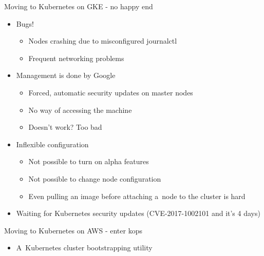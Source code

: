 \documentclass{beamer}
\begin{document}
  \begin{frame}{Moving to Kubernetes on GKE - no happy end}
  \begin{itemize}
    \item Bugs!
    \begin{itemize}
      \item Nodes crashing due to misconfigured journalctl
      \item Frequent networking problems
    \end{itemize}
    \item Management is done by Google
    \begin{itemize}
      \item Forced, automatic security updates on master nodes
      \item No way of accessing the machine
      \item Doesn't work? Too bad
    \end{itemize}
    \item Inflexible configuration
    \begin{itemize}
      \item Not possible to turn on alpha features
      \item Not possible to change node configuration
      \item Even pulling an image before attaching a~node to the cluster is hard
    \end{itemize}
  \item Waiting for Kubernetes security updates (CVE-2017-1002101 and it's 4 days)
  \end{itemize}
  \end{frame}

  \begin{frame}{Moving to Kubernetes on AWS - enter kops}
  \begin{itemize}
    \item A~Kubernetes cluster bootstrapping utility
  \end{itemize}
  \end{frame}
\end{document}
